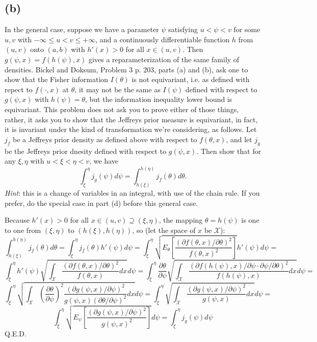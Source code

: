 \subsection*{(b)}
\ProbS
In the general case, suppose we have a parameter $\psi$ satisfying
$u < \psi < v$ for some $u,v$ with $-\infty \leq u < v \leq +\infty$,
and a continuously differentiable function $h$ from $(u,v)$ onto $(a,b)$ with $h'(x)>0$ for all $x \in (u,v)$.
Then $g(\psi, x) = f(h(\psi), x)$ gives a reparameterization of the same family of densities.
Bickel and Doksum, Problem 3 p. 203, parts (a) and (b), ask one to show that the Fisher information $I(\theta)$ is not equivariant, i.e. as defined with repect to $f(\cdot, x)$ at $\theta$, it may not be the same as $I(\psi)$ defined with respect to $g(\psi, x)$ with $h(\psi)=\theta$, but the information inequality lower bound is equivariant.
This problem does not ask you to prove either of those things, rather, it asks you to show that the Jeffreys prior measure is equivariant, in fact, it is invariant under the kind of transformation we're considering, as follows.
Let $j_f$ be a Jeffreys prior density as defined above with respect to $f(\theta, x)$, and let $j_g$ be the Jeffreys prior dnesity defined with respect to $g(\psi, x)$. Then show that for any $\xi, \eta$ with $u < \xi < \eta < v$, we have
$$
\int_{\xi}^{\eta} j_g(\psi)d\psi = \int_{h(\xi)}^{h(\eta)} j_f(\theta) d\theta.
$$
\emph{Hint}: this is a change of variables in an integral, with use of the chain rule. If you prefer, do the special case in part (d) before this general case.
\ProbE

\newcommand{\spaceX}{\mathcal{X}}

Because $h'(x)>0$ for all $x \in (u,v) \supseteq (\xi, \eta)$, the mapping $\theta = h(\psi)$ is one to one from $(\xi, \eta)$ to $(h(\xi), h(\eta))$, so (let the space of $x$ be $\spaceX$):
$$
\int_{h(\xi)}^{h(\eta)} j_f(\theta) d\theta =
\int_{\xi}^{\eta} j_f(\theta) h'(\psi) d\psi =
\int_{\xi}^{\eta} \sqrt{E_{\theta} \left[\frac{(\partial f(\theta, x) / \partial \theta)^2}{f(\theta, x)^2}\right] }h'(\psi) d\psi =
$$
$$
\int_{\xi}^{\eta} h'(\psi) \sqrt{ \int_{\spaceX} \frac{(\partial f(\theta, x) / \partial \theta)^2}{f(\theta, x)} dx }d\psi =
\int_{\xi}^{\eta} \frac{\partial \theta}{\partial \psi} \sqrt{ \int_{\spaceX} \frac{(\partial f(h(\psi), x) / \partial \psi \cdot \partial \psi / \partial \theta)^2}{f(h(\psi), x)} dx }d\psi =
$$
$$
\int_{\xi}^{\eta} \sqrt{ \int_{\spaceX} \left(\frac{\partial \theta}{\partial \psi}\right)^2 \frac{(\partial g(\psi, x) / \partial \psi)^2}{ g(\psi, x) ( \partial \theta / \partial \psi)^2} dx }d\psi =
\int_{\xi}^{\eta} \sqrt{ \int_{\spaceX} \frac{(\partial g(\psi, x) / \partial \psi)^2}{ g(\psi, x)} dx }d\psi =
$$
$$
\int_{\xi}^{\eta} \sqrt{E_{\psi} \left[\frac{(\partial g(\psi, x) / \partial \psi)^2}{g(\psi, x)^2}\right] } d\psi =
\int_{\xi}^{\eta} j_g(\psi) d\psi
$$
Q.E.D.
